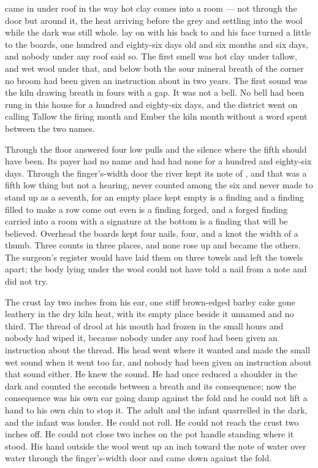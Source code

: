 
 came in under  roof in  the way hot clay comes into a room --- not through the door but around it, the heat arriving before the grey and settling into the wool while the dark was still whole.  lay on  with his back to  and his face turned a little to the boards, one hundred and eighty-six days old and six months and six days, and nobody under any roof said so. The first smell was hot clay under tallow, and wet wool under that, and below both the sour mineral breath of the corner no broom had been given an instruction about in two years. The first sound was the kiln drawing breath in fours with a gap. It was not a bell. No bell had been rung in this house for a hundred and eighty-six days, and the district went on calling Tallow the firing month and Ember the kiln month without a word spent between the two names.

Through the floor  answered four low pulls and the silence where the fifth should have been. Its payer had no name and had had none for a hundred and eighty-six days. Through the finger's-width door the river kept its note of , and that was a fifth low thing but not a hearing, never counted among the six and never made to stand up as a seventh, for an empty place kept empty is a finding and a finding filled to make a row come out even is a finding forged, and a forged finding carried into a room with a signature at the bottom is a finding that will be believed. Overhead the boards kept four nails, four, and a knot the width of a thumb. Three counts in three places, and none rose up and became the others. The surgeon's register would have laid them on three towels and left the towels apart; the body lying under the wool could not have told a nail from a note and did not try.

The crust lay two inches from his ear, one stiff brown-edged barley cake gone leathery in the dry kiln heat, with its empty place beside it unnamed and no third. The thread of drool at his mouth had frozen in the small hours and nobody had wiped it, because nobody under any roof had been given an instruction about the thread. His head went where it wanted and made the small wet sound when it went too far, and nobody had been given an instruction about that sound either. He knew the sound. He had once reduced a shoulder in the dark and counted the seconds between a breath and its consequence; now the consequence was his own ear going damp against the fold and he could not lift a hand to his own chin to stop it. The adult and the infant quarrelled in the dark, and the infant was louder. He could not roll. He could not reach the crust two inches off. He could not close two inches on the pot handle standing where it stood. His hand outside the wool went up an inch toward the note of water over water through the finger's-width door and came down against the fold.

